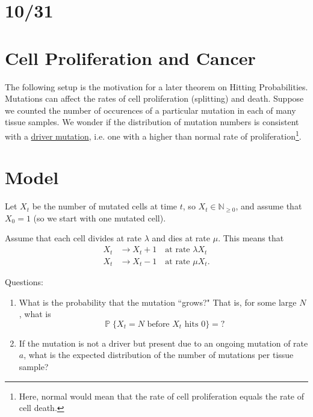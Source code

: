 \documentclass[../../../Master/AppliedStochastics.tex]{subfiles}
\author{Andrew}  %
\date{October 31 and November 2}    %
\theoremstyle{definition}
\DeclareMathOperator{\p}{\mathbb{P}}
\begin{document}
\section*{10/31}
\section*{Cell Proliferation and Cancer}
The following setup is the motivation for a later theorem on Hitting Probabilities. Mutations can affect the rates of cell proliferation (splitting) and death. Suppose we counted the number of occurences of a particular mutation in each of many tissue samples. We wonder if the distribution of mutation numbers is consistent with a \underline{driver mutation}, i.e. one with a higher than normal rate of proliferation\footnote{Here, normal would mean that the rate of cell proliferation equals the rate of cell death.}.


\section*{Model}
Let $X_t$ be the number of mutated cells at time $t$, so $X_t \in \mathbb{N}_{\geq 0}$, and assume that $X_0 =1$ (so we start with one mutated cell). 

Assume that each cell divides at rate $\lambda$ and dies at rate $\mu$. This means that
\begin{align*}
	X_t &\to X_t + 1 \quad \text{at rate $\lambda X_t$}\\
	X_t & \to X_t - 1 \quad \text{at rate $\mu X_t$}.
\end{align*}

Questions:
\begin{enumerate}
	\item What is the probability that the mutation ``grows?" That is, for some large $N$, what is 
	\[
		\p\{X_t = N \text{ before } X_t \text{ hits } 0 \}= ?
	\]
	\item If the mutation is not a driver but present due to an ongoing mutation of rate $a$, what is the expected distribution of the number of mutations per tissue sample?
\end{enumerate}
\end{document}
